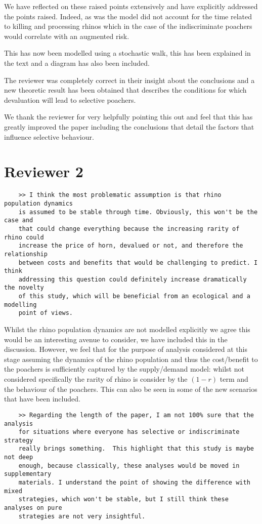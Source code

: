 \documentclass[10pt]{article}
\begin{document}
We have reflected on these raised points extensively and have explicitly
addressed the points raised. Indeed, as was the model did not account for the
time related to killing and processing rhinos which in the case of the
indiscriminate poachers would correlate with an augmented risk.

This has now been modelled using a stochastic walk, this has been
explained in the text and a diagram has also been included.

The reviewer was completely correct in their insight about the conclusions and
a new theoretic result has been obtained that describes the conditions for which
devaluation will lead to selective poachers.

We thank the reviewer for very helpfully pointing this out and feel that this
has greatly improved the paper including the conclusions that detail the factors
that influence selective behaviour.

\section{Reviewer 2}

\begin{verbatim}
    >> I think the most problematic assumption is that rhino population dynamics
    is assumed to be stable through time. Obviously, this won't be the case and
    that could change everything because the increasing rarity of rhino could
    increase the price of horn, devalued or not, and therefore the relationship
    between costs and benefits that would be challenging to predict. I think
    addressing this question could definitely increase dramatically the novelty
    of this study, which will be beneficial from an ecological and a modelling
    point of views.
\end{verbatim}

Whilst the rhino population dynamics are not modelled explicitly we agree this
would be an interesting avenue to consider, we have included this in the
discussion. However, we feel that for the purpose of analysis considered at this
stage assuming the dynamics of the rhino population and thus the cost/benefit to
the poachers is sufficiently captured by the supply/demand model: whilst not
considered specifically the rarity of rhino is consider by the \((1-r)\) term
and the behaviour of the poachers. This can also be seen in some of the new
scenarios that have been included.


\begin{verbatim}
    >> Regarding the length of the paper, I am not 100% sure that the analysis
    for situations where everyone has selective or indiscriminate strategy
    really brings something.  This highlight that this study is maybe not deep
    enough, because classically, these analyses would be moved in supplementary
    materials. I understand the point of showing the difference with mixed
    strategies, which won't be stable, but I still think these analyses on pure
    strategies are not very insightful.
\end{verbatim}
\end{document}
